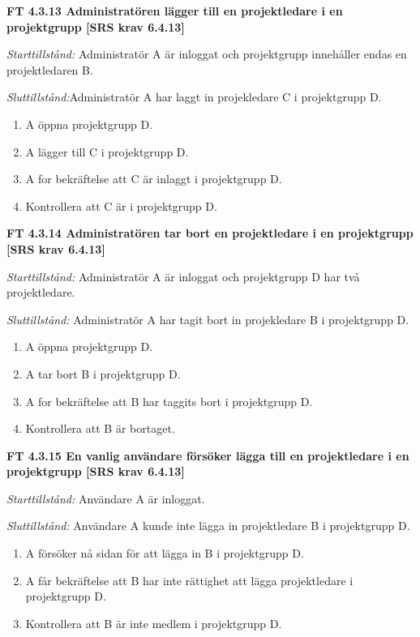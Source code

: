 \documentclass[a4paper]{article}
\begin{document}
\textbf{FT 4.3.13 Administratören lägger till en projektledare i en projektgrupp [SRS krav 6.4.13]}


\emph{Starttillstånd:} Administratör A är inloggat och projektgrupp innehåller endas en projektledaren B.

\emph{Sluttillstånd:}Administratör A har laggt in projekledare C i projektgrupp D.

\begin{enumerate}
\item A öppna projektgrupp D.
\item A lägger till C i projektgrupp D.
\item A for bekräftelse att C är inlaggt i projektgrupp D.
\item Kontrollera att C är i projektgrupp D.
\end{enumerate}

\textbf{FT 4.3.14 Administratören tar bort en projektledare i en projektgrupp [SRS krav 6.4.13]}

\emph{Starttillstånd:} Administratör A är inloggat och projektgrupp D har två projektledare.

\emph{Sluttillstånd:} Administratör A har tagit bort  in projekledare B i projektgrupp D.

\begin{enumerate}
\item A öppna projektgrupp D.
\item A tar bort B i projektgrupp D.
\item A for bekräftelse att B har taggits  bort i projektgrupp D.
\item Kontrollera att B är bortaget.
\end{enumerate}

\textbf{FT 4.3.15 En vanlig användare försöker lägga till en projektledare i en projektgrupp [SRS krav 6.4.13]} 

\emph{Starttillstånd:} Användare A är inloggat.

\emph{Sluttillstånd:} Användare A kunde inte lägga in projektledare B i projektgrupp D.

\begin{enumerate}
\item A försöker nå sidan för att lägga in B i projektgrupp D.
\item A får bekräftelse att B har inte rättighet att lägga projektledare i projektgrupp D.
\item Kontrollera att B är inte medlem i projektgrupp D.
\end{enumerate}
\end{document}
